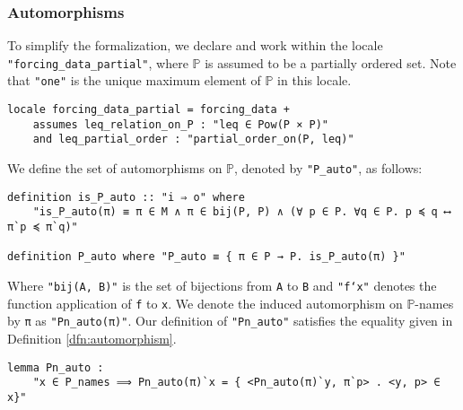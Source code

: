 \documentclass{report}
\newenvironment{isaframe}{\begin{mdframed}[topline=false, rightline=false, bottomline=false]}{\end{mdframed}}
\begin{document}
\subsubsection{Automorphisms}
To simplify the formalization, we declare and work within the locale \texttt{"forcing\_data\_partial"}, 
where $\mathbb{P}$ is assumed to be a partially ordered set. 
Note that \texttt{"one"} is the unique maximum element of $\mathbb{P}$ in this locale.

\begin{isaframe}
\begin{verbatim}
locale forcing_data_partial = forcing_data + 
    assumes leq_relation_on_P : "leq ∈ Pow(P × P)" 
    and leq_partial_order : "partial_order_on(P, leq)" 
\end{verbatim}
\end{isaframe}

We define the set of automorphisms on $\mathbb{P}$, denoted by \texttt{"P\_auto"}, as follows:
\begin{isaframe}
\begin{verbatim}
definition is_P_auto :: "i ⇒ o" where
    "is_P_auto(π) ≡ π ∈ M ∧ π ∈ bij(P, P) ∧ (∀ p ∈ P. ∀q ∈ P. p ≼ q ⟷ π`p ≼ π`q)"  

definition P_auto where "P_auto ≡ { π ∈ P → P. is_P_auto(π) }" 
\end{verbatim}
\end{isaframe}

Where \texttt{"bij(A, B)"} is the set of bijections from \texttt{A} to \texttt{B}
and \texttt{"f`x"} denotes the function application of \texttt{f} to \texttt{x}.
We denote the induced automorphism on $\mathbb{P}$-names by \texttt{π} as \texttt{"Pn\_auto(π)"}.
Our definition of \texttt{"Pn\_auto"} satisfies the equality given in Definition \ref{dfn:automorphism}.

\begin{isaframe}
\begin{verbatim}
lemma Pn_auto : 
    "x ∈ P_names ⟹ Pn_auto(π)`x = { <Pn_auto(π)`y, π`p> . <y, p> ∈ x}"  
\end{verbatim}
\end{isaframe}
\end{document}
